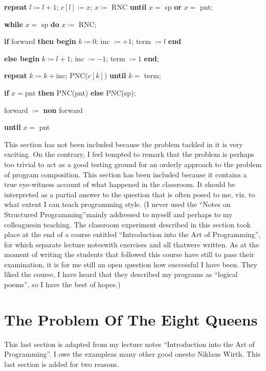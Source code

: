 \documentclass[twoside,11pt]{book}
\begin{document}
\quad \quad \textbf{repeat} $l\coloneq l + 1$; $c[l]\coloneq x$; $x \coloneq$ RNC \textbf{until} $x =$ sp \textbf{or} $x =$ pnt;

\quad \quad \textbf{while} $x =$ sp \textbf{do} $x\coloneq$ RNC;

\quad \quad \textbf{if} forward \textbf{then begin} $k\coloneq 0$; inc $\coloneq + 1$; term $\coloneq l$ \textbf{end}

\quad \quad\quad \textbf{else begin} $k\coloneq l + 1$; inc $\coloneq -1$; term $\coloneq 1$ \textbf{end};

\quad \quad \textbf{repeat} $k\coloneq k + \text{inc}$; PNC($c[k]$) \textbf{until} $k =$ term;

\quad \quad \textbf{if} $x = \text{pnt}$ \textbf{then} PNC(pnt) \textbf{else} PNC(sp);

\quad \quad forward $\coloneq$ \textbf{non} forward

\quad \textbf{until} $x =$ pnt

This section has not been included because the problem tackled in it is very exciting. On the contrary, I feel tempted to remark that the problem is perhaps too trivial to act as a good testing ground for an orderly approach to the problem of program composition. This section has been included because it contains a true eye-witness account of what happened in the classroom. It should be interpreted as a partial answer to the question that is often posed to me, viz. to what extent I can teach programming style. (I never used the ``Notes on Structured Programming''\textemdash{}mainly addressed to myself and perhaps to my colleagues\textemdash{}in teaching. The classroom experiment described in this section took place at the end of a course entitled ``Introduction into the Art of Programming'', for which separate lecture notes\textemdash{}with exercises and all that\textemdash{}were written. As at the moment of writing the students that followed this course have still to pass their examination, it is for me still an open question how successful I have been. They liked the course, I have heard that they described my programs as ``logical poems'', so I have the best of hopes.)

\section[The problem of the eight queens]{The Problem Of The Eight Queens}

This last section is adapted from my lecture notes ``Introduction into the Art of Programming''. I owe the example\textemdash{}as many other good ones\textemdash{}to Niklaus Wirth. This last section is added for two reasons.
\end{document}
